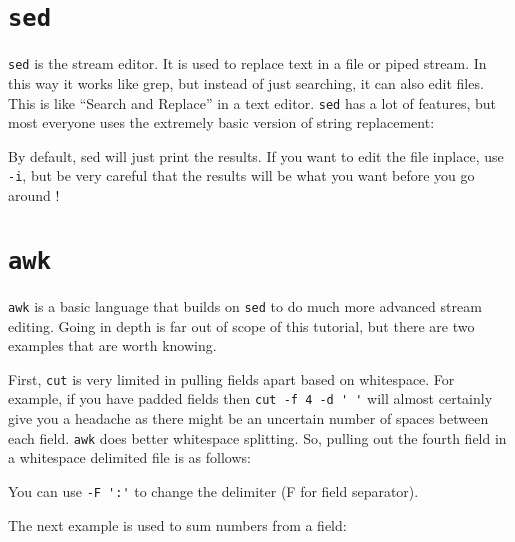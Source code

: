\begin{prompt}
\end{prompt}

\section{\texttt{sed}}

\lstinline|sed| is the stream editor. It is used to replace text in a
file or piped stream. In this way it works like grep, but instead of just
searching, it can also edit files. This is like ``Search and Replace'' in a text
editor. \lstinline|sed| has a lot of features, but most everyone uses the extremely
basic version of string replacement:

\begin{prompt}
\end{prompt}

By default, sed will just print the results. If you want to edit the file inplace, use
\lstinline|-i|, but be very careful that the results will be what you want before you go
around !

\section{\texttt{awk}}
\lstinline|awk| is a basic language that builds on \lstinline|sed| to do much more advanced
stream editing. Going in depth is far out of scope of this tutorial, but there
are two examples that are worth knowing.

First, \lstinline|cut| is very limited in pulling fields apart based on whitespace. For
example, if you have padded fields then \lstinline|cut -f 4 -d ' '| will almost
certainly give you a headache as there might be an uncertain number of spaces
between each field. \lstinline|awk| does better whitespace splitting. So, pulling out
the fourth field in a whitespace delimited file is as follows:

\begin{prompt}
\end{prompt}

You can use \lstinline|-F ':'| to change the delimiter (F for field separator).

The next example is used to sum numbers from a field:

\begin{prompt}
\end{prompt}

